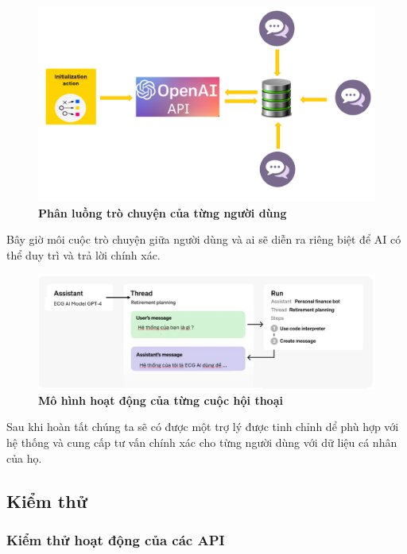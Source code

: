\begin{figure}[H]
  \centering
  \includegraphics[scale=0.5]{Images/server/ai/tranning-ai-data.png}
  \caption[Phân luồng trò chuyện của từng người dùng]{\bfseries \fontsize{12pt}{0pt}
  \selectfont Phân luồng trò chuyện của từng người dùng}
  \label{thread-ai} %
\end{figure}

Bây giờ môi cuộc trò chuyện giữa người dùng và ai sẽ diễn ra riêng biệt để AI có thể duy trì và trả lời chính xác.
\begin{figure}[H]
  \centering
  \includegraphics[scale=0.5]{Images/server/ai/thread-message.png}
  \caption[Mô hình hoạt động của từng cuộc hội thoại]{\bfseries \fontsize{12pt}{0pt}
  \selectfont Mô hình hoạt động của từng cuộc hội thoại}
  \label{check-ai} %
\end{figure}

Sau khi hoàn tất chúng ta sẽ có được một trợ lý được tinh chỉnh dể phù hợp với hệ thống và cung cấp tư vấn chính xác cho từng người dùng với dữ liệu cá nhân của họ.

\subsection{Kiểm thử}

\subsubsection{Kiểm thử hoạt động của các API}


